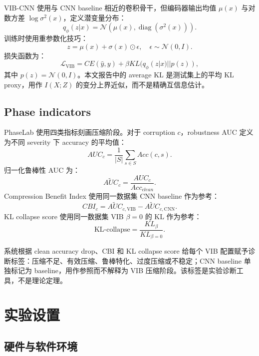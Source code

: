 \documentclass[11pt,a4paper]{article}
\begin{document}
VIB-CNN 使用与 CNN baseline 相近的卷积骨干，但编码器输出均值 $\mu(x)$ 与对数方差 $\log\sigma^2(x)$，定义潜变量分布：
\begin{equation}
q_\phi(z|x)=\mathcal{N}(\mu(x),\operatorname{diag}(\sigma^2(x))).
\end{equation}
训练时使用重参数化技巧：
\begin{equation}
z=\mu(x)+\sigma(x)\odot\epsilon,\quad \epsilon\sim\mathcal{N}(0,I).
\end{equation}
损失函数为：
\begin{equation}
\mathcal{L}_{\text{VIB}}=CE(\hat{y},y)+\beta KL(q_\phi(z|x)||p(z)),
\end{equation}
其中 $p(z)=\mathcal{N}(0,I)$。本文报告中的 average KL 是测试集上的平均 KL proxy，用作 $I(X;Z)$ 的变分上界近似，而不是精确互信息估计。

\subsection{Phase indicators}

PhaseLab 使用四类指标刻画压缩阶段。对于 corruption $c$，robustness AUC 定义为不同 severity 下 accuracy 的平均值：
\begin{equation}
AUC_c=\frac{1}{|S|}\sum_{s\in S}Acc(c,s).
\end{equation}
归一化鲁棒性 AUC 为：
\begin{equation}
\widetilde{AUC}_c=\frac{AUC_c}{Acc_{clean}}.
\end{equation}
Compression Benefit Index 使用同一数据集 CNN baseline 作为参考：
\begin{equation}
CBI_c=\widetilde{AUC}_{c,\text{VIB}}-\widetilde{AUC}_{c,\text{CNN}}.
\end{equation}
KL collapse score 使用同一数据集 VIB $\beta=0$ 的 KL 作为参考：
\begin{equation}
\text{KL-collapse}=\frac{KL_\beta}{KL_{\beta=0}}.
\end{equation}

系统根据 clean accuracy drop、CBI 和 KL collapse score 给每个 VIB 配置赋予诊断标签：压缩不足、有效压缩、鲁棒特化、过度压缩或不稳定；CNN baseline 单独标记为 baseline，用作参照而不解释为 VIB 压缩阶段。该标签是实验诊断工具，不是理论定理。

\section{实验设置}

\subsection{硬件与软件环境}
\end{document}

